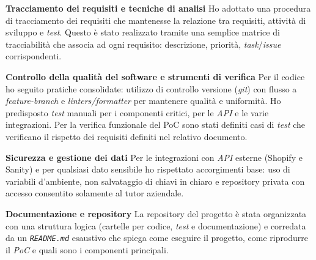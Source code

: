 \medskip
\noindent\textbf{Tracciamento dei requisiti e tecniche di analisi}
Ho adottato una procedura di tracciamento dei requisiti che mantenesse la relazione tra requisiti, attività di sviluppo e \emph{test}. 
Questo è stato realizzato tramite una semplice matrice di tracciabilità che associa ad ogni requisito: descrizione, priorità, \emph{task}/\emph{issue} corrispondenti.

\medskip
\noindent\textbf{Controllo della qualità del software e strumenti di verifica}
Per il codice ho seguito pratiche consolidate: utilizzo di controllo versione 
(\emph{git}) con flusso a \emph{feature-branch} e \emph{linters/formatter} per mantenere qualità e uniformità. 
Ho predisposto \emph{test} manuali per i componenti critici, per le \emph{API} e le varie integrazioni. 
Per la verifica funzionale del PoC sono stati definiti casi di \emph{test} che verificano il rispetto dei requisiti definiti nel relativo documento.

\medskip
\noindent\textbf{Sicurezza e gestione dei dati}
Per le integrazioni con \emph{API} esterne (Shopify e Sanity) e per qualsiasi dato sensibile ho rispettato accorgimenti base: 
uso di variabili d'ambiente, non salvataggio di chiavi in chiaro e repository privata con accesso consentito solamente al tutor aziendale.

\medskip
\noindent\textbf{Documentazione e repository}
La repository del progetto è stata organizzata con una struttura logica (cartelle per codice, \emph{test} e documentazione) 
e corredata da un \texttt{\emph{README.md}} esaustivo che spiega come eseguire il progetto, come riprodurre il \emph{PoC} e quali sono i componenti principali.





